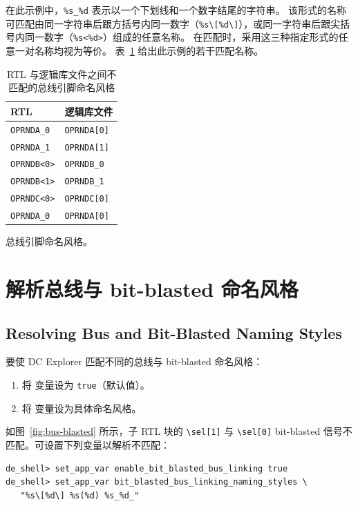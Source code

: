 在此示例中，\verb|%s_%d| 表示以一个下划线和一个数字结尾的字符串。
该形式的名称可匹配由同一字符串后跟方括号内同一数字（\verb|%s\[%d\]|），或同一字符串后跟尖括号内同一数字（\verb|%s<%d>|）组成的任意名称。
在匹配时，采用这三种指定形式的任意一对名称均视为等价。
表~\ref{tab:bus-styles} 给出此示例的若干匹配名称。

\begin{table}[htbp]
\centering
\caption{RTL 与逻辑库文件之间不匹配的总线引脚命名风格}
\label{tab:bus-styles}
\begin{tabularx}{\textwidth}{@{}X X@{}}
\toprule
\textbf{RTL} & \textbf{逻辑库文件} \\
\midrule
\texttt{OPRNDA\_0} & \texttt{OPRNDA[0]} \\
\texttt{OPRNDA\_1} & \texttt{OPRNDA[1]} \\
\texttt{OPRNDB<0>} & \texttt{OPRNDB\_0} \\
\texttt{OPRNDB<1>} & \texttt{OPRNDB\_1} \\
\texttt{OPRNDC<0>} & \texttt{OPRNDC[0]} \\
\texttt{OPRNDA\_0} & \texttt{OPRNDA[0]} \\
\bottomrule
\end{tabularx}
\end{table}

\begin{seeAlsoBox}
总线引脚命名风格。
\end{seeAlsoBox}

\section{解析总线与 bit-blasted 命名风格}
\subsection*{Resolving Bus and Bit-Blasted Naming Styles}

要使 DC Explorer 匹配不同的总线与 bit-blasted 命名风格：
\begin{enumerate}
  \item 将  变量设为 \texttt{true}（默认值）。
  \item 将  变量设为具体命名风格。
\end{enumerate}

如图~\ref{fig:bus-blasted} 所示，子 RTL 块的 \verb|\sel[1]| 与 \verb|\sel[0]| bit-blasted 信号不匹配。可设置下列变量以解析不匹配：
\begin{lstlisting}
de_shell> set_app_var enable_bit_blasted_bus_linking true
de_shell> set_app_var bit_blasted_bus_linking_naming_styles \
   "%s\[%d\] %s(%d) %s_%d_"
\end{lstlisting}

